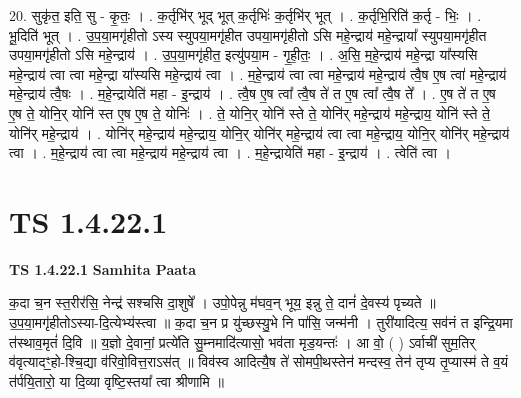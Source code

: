 \documentclass[17pt]{extarticle}
\begin{document}
20. सुकृ॑त॒ इति॒ सु - कृ॒तः॒ । . क॒र्तृभि॑र् भूद् भूत् क॒र्तृभिः॑ क॒र्तृभि॑र् भूत् । . क॒र्तृभि॒रिति॑ क॒र्तृ - भिः॒ । . भू॒दिति॑ भूत् । . उ॒प॒या॒मगृ॑हीतो ऽस्य स्युपया॒मगृ॑हीत उपया॒मगृ॑हीतो ऽसि महे॒न्द्राय॑ महे॒न्द्राया᳚ स्युपया॒मगृ॑हीत उपया॒मगृ॑हीतो ऽसि महे॒न्द्राय॑ । . उ॒प॒या॒मगृ॑हीत॒ इत्यु॑पया॒म - गृ॒ही॒तः॒ । . अ॒सि॒ म॒हे॒न्द्राय॑ महे॒न्द्रा या᳚स्यसि महे॒न्द्राय॑ त्वा त्वा महे॒न्द्रा या᳚स्यसि महे॒न्द्राय॑ त्वा । . म॒हे॒न्द्राय॑ त्वा त्वा महे॒न्द्राय॑ महे॒न्द्राय॑ त्वै॒ष ए॒ष त्वा॑ महे॒न्द्राय॑ महे॒न्द्राय॑ त्वै॒षः । . म॒हे॒न्द्रायेति॑ महा - इ॒न्द्राय॑ । . त्वै॒ष ए॒ष त्वा᳚ त्वै॒ष ते॑ त ए॒ष त्वा᳚ त्वै॒ष ते᳚ । . ए॒ष ते॑ त ए॒ष ए॒ष ते॒ योनि॒र् योनि॑ स्त ए॒ष ए॒ष ते॒ योनिः॑ । . ते॒ योनि॒र् योनि॑ स्ते ते॒ योनि॑र् महे॒न्द्राय॑ महे॒न्द्राय॒ योनि॑ स्ते ते॒ योनि॑र् महे॒न्द्राय॑ । . योनि॑र् महे॒न्द्राय॑ महे॒न्द्राय॒ योनि॒र् योनि॑र् महे॒न्द्राय॑ त्वा त्वा महे॒न्द्राय॒ योनि॒र् योनि॑र् महे॒न्द्राय॑ त्वा । . म॒हे॒न्द्राय॑ त्वा त्वा महे॒न्द्राय॑ महे॒न्द्राय॑ त्वा । . म॒हे॒न्द्रायेति॑ महा - इ॒न्द्राय॑ । . त्वेति॑ त्वा । \newline
\pagebreak
{}

\section{ TS 1.4.22.1 }

\textbf{TS 1.4.22.1 } \newline
\textbf{Samhita Paata} \newline

क॒दा च॒न स्त॒रीर॑सि॒ नेन्द्र॑ सश्चसि दा॒शुषे᳚ । उपो॒पेन्नु म॑घव॒न् भूय॒ इन्नु ते॒ दानं॑ दे॒वस्य॑ पृच्यते ॥ उ॒प॒या॒मगृ॑हीतोऽस्या-दि॒त्येभ्य॑स्त्वा ॥ क॒दा च॒न प्र यु॑च्छस्यु॒भे नि पा॑सि॒ जन्म॑नी । तुरी॑यादित्य॒ सव॑नं त इन्द्रि॒यमा त॑स्थाव॒मृतं॑ दि॒वि ॥ य॒ज्ञो दे॒वानां॒ प्रत्ये॑ति सु॒म्नमादि॑त्यासो॒ भव॑ता मृड॒यन्तः॑ । आ वो॒ ( ) ऽर्वाची॑ सुम॒तिर् व॑वृत्यादꣳ॒॒हो-श्चि॒द्या व॑रिवो॒वित्त॒राऽस॑त् ॥ विव॑स्व आदित्यै॒ष ते॑ सोमपी॒थस्तेन॑ मन्दस्व॒ तेन॑ तृप्य तृ॒प्यास्म॑ ते व॒यं त॑र्पयि॒तारो॒ या दि॒व्या वृष्टि॒स्तया᳚ त्वा श्रीणामि ॥ \newline
\end{document}
